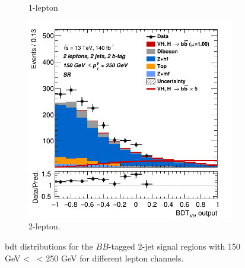 \begin{figure}[h!]
\begin{subfigure}[b]{0.32\textwidth}
      \caption{1-lepton}
      \label{fig:plots_VHbb_ex_1L_SR}
  \end{subfigure}
  \begin{subfigure}[b]{0.32\textwidth}
    \centering
    \includegraphics[width=\textwidth]{Images/VH/Own_fit/prefit_VHbb/Region_distmva_BMax250_BMin150_DSR_J2_TTypebb_T2_L2_Y6051_Prefit.png}
    \caption{2-lepton.}
    \label{fig:plots_VHbb_ex_2L_SR}
\end{subfigure}
  \caption{\gls{bdt} distributions for the $BB$-tagged 2-jet signal regions with 150 GeV < \ptv\ < 250 GeV for different lepton channels.}
  \label{fig:plots_VHbb_ex_SR}
\end{figure} 

